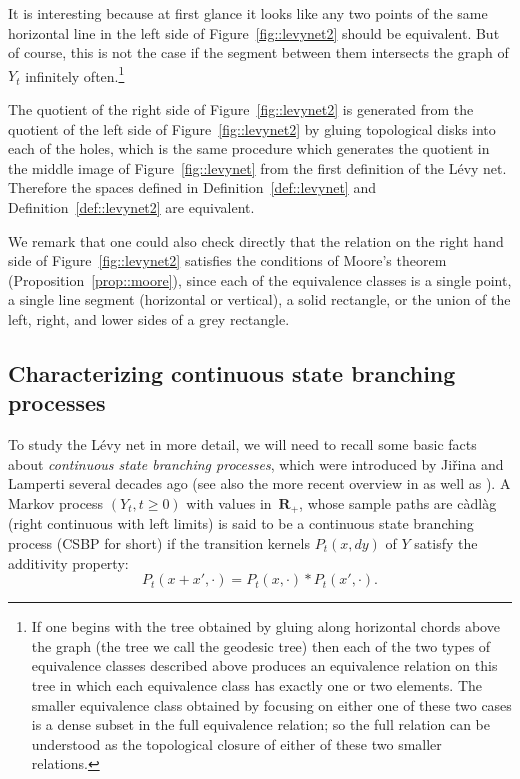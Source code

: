 \documentclass[10pt]{amsart}
\theoremstyle{plain}
\numberwithin{theorem}{section}
\theoremstyle{definition}
\newcommand{\R}{\mathbf{R}}
\newcommand{\cadlag}{càdlàg}
\begin{document}
\smallskip
It is interesting because at first glance it looks like any two points of the same horizontal line in the left side of Figure~\ref{fig::levynet2} should be equivalent. But of course, this is not the case if the segment between them intersects the graph of $Y_t$ infinitely often.\footnote{If one begins with the tree obtained by gluing along horizontal chords above the graph (the tree we call the geodesic tree) then each of the two types of equivalence classes described above produces an equivalence relation on this tree in which each equivalence class has exactly one or two elements. The smaller equivalence class obtained by focusing on either one of these two cases is a dense subset in the full equivalence relation; so the full relation can be understood as the topological closure of either of these two smaller relations.}

The quotient of the right side of Figure~\ref{fig::levynet2} is generated from the quotient of the left side of Figure~\ref{fig::levynet2} by gluing topological disks into each of the holes, which is the same procedure which generates the quotient in the middle image of Figure~\ref{fig::levynet} from the first definition of the Lévy net. Therefore the spaces defined in Definition~\ref{def::levynet} and Definition~\ref{def::levynet2} are equivalent.

We remark that one could also check directly that the relation on the right hand side of Figure~\ref{fig::levynet2} satisfies the conditions of Moore's theorem (Proposition~\ref{prop::moore}), since each of the equivalence classes is a single point, a single line segment (horizontal or vertical), a solid rectangle, or the union of the left, right, and lower sides of a grey rectangle.

\subsection{Characterizing continuous state branching processes}
\label{subsec::csbp}

To study the Lévy net in more detail, we will need to recall some basic facts about \emph{continuous state branching processes}, which were introduced by Ji\v{r}ina and Lamperti several decades ago \cite{miloslav, lamperticsbp, lampertibranchingaslimit} (see also the more recent overview in \cite{legallspatialbranchingbook} as well as \cite[Chap.\,10]{kyp2006levy_fluctuations}).
A Markov process $(Y_t, t \geq 0)$ with values in~$\R_+$, whose sample paths are {\cadlag} (right continuous with left limits) is said to be a continuous state branching process (CSBP for short) if the transition kernels $P_t(x,dy)$ of $Y$ satisfy the additivity property:
\begin{equation}
\label{eqn::CSBPproperty}
P_t(x+x', \cdot) = P_t(x, \cdot) * P_t(x',\cdot).
\end{equation}
\end{document}
